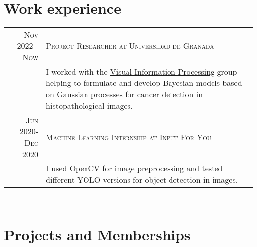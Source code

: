 \documentclass[a4paper,10pt]{article} %
\begin{document}

\section{Work experience}

\begin{tabular}{r|p{11cm}}

\textsc{Nov 2022 - Now }  & \textsc{Project Researcher at Universidad de Granada} \\
  & \footnotesize I worked with the \href{https://ccia.ugr.es/vip/index.html}{Visual Information Processing} group helping to formulate and develop Bayesian models based on Gaussian processes for cancer detection in histopathological images.\\

  \textsc{Jun 2020-Dec 2020}  & \textsc{Machine Learning Internship at Input For You} \\
  & \footnotesize I used OpenCV for image preprocessing and tested different YOLO versions for object detection in images.
\end{tabular}\\



\section{Projects and Memberships}
\end{document}
